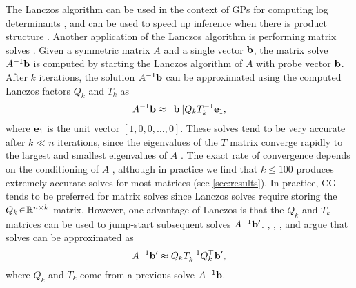 The Lanczos algorithm can be used in the context of GPs for computing log determinants \cite{dong2017scalable},
and can be used to speed up inference when there is product structure \cite{gardner2018product}.
Another application of the Lanczos algorithm is performing matrix solves \cite{lanczos1950iteration,parlett1980new,saad1987lanczos}.
Given a symmetric matrix $A$ and a single vector $\mathbf{b}$, the matrix solve $A^{-1} \mathbf{b}$ is computed by starting the Lanczos algorithm of $A$ with probe vector $\mathbf{b}$.
After $k$ iterations, the solution $A^{-1} \mathbf{b}$ can be approximated using the computed Lanczos factors $Q_{k}$ and $T_{k}$ as
%
\begin{equation}
  A^{-1} \mathbf{b} \approx \Vert \mathbf{b} \Vert Q_k T_k^{-1} \mathbf{e}_1,
  \label{eq:lanczos_single_solve}
\end{equation}
%
where $\mathbf{e}_1$ is the unit vector $[1, 0, 0, \ldots, 0]$.
These solves tend to be very accurate after $k \ll n$ iterations, since the eigenvalues of the $T$ matrix converge rapidly to the largest and smallest eigenvalues of $A$ \cite{demmel1997applied}.
The exact rate of convergence depends on the conditioning of $A$ \cite{golub2012matrix}, although in practice we find that $k\leq100$ produces extremely accurate solves for most matrices (see \autoref{sec:results}).
In practice, CG tends to be preferred for matrix solves since Lanczos solves require storing the $Q_k \! \in \! \mathbb{R}^{n \times k}$ matrix.
However, one advantage of Lanczos is that the $Q_k$ and $T_k$ matrices can be used to jump-start subsequent solves $A^{-1} \mathbf{b}'$.
\citet{parlett1980new}, \citet{saad1987lanczos}, \citet{schneider2001krylov}, and \citet{nickisch2009bayesian} argue that solves can be approximated as
%
\begin{equation}
  A^{-1} \mathbf{b}' \approx Q_k T_k^{-1} Q_k^\top \mathbf{b}',
  \label{eq:lanczos_solve}
\end{equation}
%
where $Q_k$ and $T_k$ come from a previous solve $A^{-1} \mathbf{b}$.


